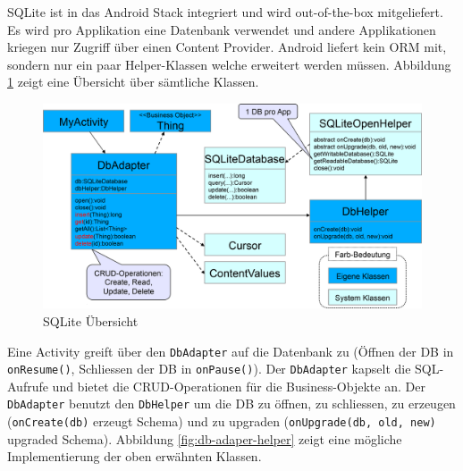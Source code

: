 SQLite ist in das Android Stack integriert und wird out-of-the-box mitgeliefert. Es wird pro Applikation eine Datenbank verwendet und andere Applikationen kriegen nur Zugriff über einen Content Provider. Android liefert kein ORM mit, sondern nur ein paar Helper-Klassen welche erweitert werden müssen. Abbildung \ref{fig:sqlite-uebersicht} zeigt eine Übersicht über sämtliche Klassen.
\begin{figure}
\centering
\includegraphics[width=0.9\linewidth]{fig/sqlite-uebersicht}
\caption{SQLite Übersicht}
\label{fig:sqlite-uebersicht}
\end{figure}
Eine Activity greift über den \texttt{DbAdapter} auf die Datenbank zu (Öffnen der DB in \texttt{onResume()}, Schliessen der DB in \texttt{onPause()}). Der \texttt{DbAdapter} kapselt die SQL-Aufrufe und bietet die CRUD-Operationen für die Business-Objekte an. Der \texttt{DbAdapter} benutzt den \texttt{DbHelper} um die DB zu öffnen, zu schliessen, zu erzeugen (\texttt{onCreate(db)} erzeugt Schema) und zu upgraden (\texttt{onUpgrade(db, old, new)} upgraded Schema). Abbildung \ref{fig:db-adaper-helper} zeigt eine mögliche Implementierung der oben erwähnten Klassen.
